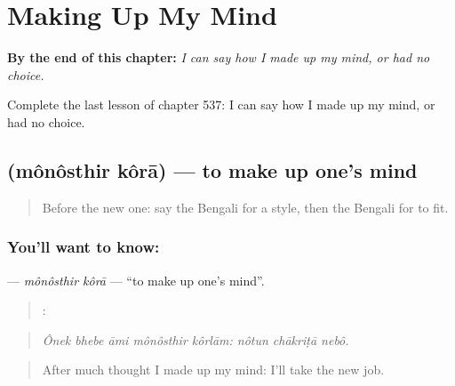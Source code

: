 
\chapter{Making Up My Mind}
\label{ch:bn-making-up-my-mind}

\begin{chapteropening}
\textbf{By the end of this chapter:} \emph{I can say how I made up my mind, or had no choice.}

Complete the last lesson of chapter 537: I can say how I made up my mind, or had no choice.
\end{chapteropening}

\section[\texorpdfstring{\bn{মনস্থির} \bn{করা} (mônôsthir kôrā)}{মনস্থির করা (mônôsthir kôrā)}]{  (mônôsthir kôrā) — to make up one's mind}

\label{lesson:BN-C537-monosthir-kora}



\begin{quote}
Before the new one: say the Bengali for a style, then the Bengali for to fit.
\end{quote}

\subsection*{You'll want to know:  }
\textbf{ } — \emph{mônôsthir kôrā} — \textquotedblleft{}to make up one's mind\textquotedblright{}.

\begin{quote}
    :   
\end{quote}

\begin{quote}
\emph{Ônek bhebe āmi mônôsthir kôrlām: nôtun chākriṭā nebô.}
\end{quote}

\begin{quote}
After much thought I made up my mind: I'll take the new job.
\end{quote}

